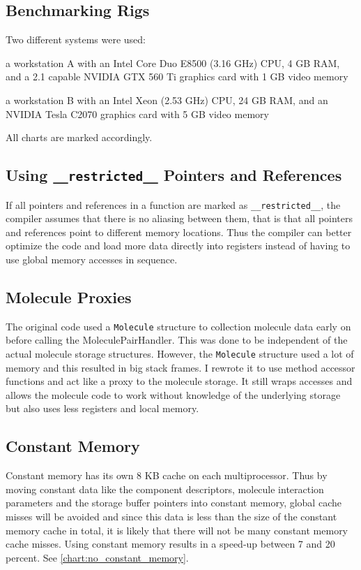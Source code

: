\subsection{Benchmarking Rigs}
Two different systems were used:
\begin{compactitem}
\item a workstation A with an Intel Core Duo E8500 (\@ 3.16 GHz) CPU, 4 GB RAM, and a \cuda{} 2.1 capable NVIDIA GTX 560 Ti graphics card with 1 GB video memory
\item a workstation B with an Intel Xeon (\@ 2.53 GHz) CPU, 24 GB RAM, and an NVIDIA Tesla C2070 graphics card with 5 GB video memory
\end{compactitem}
All charts are marked accordingly.

\subsection{Using \lstinline!__restricted__! Pointers and References}
If all pointers and references in a function are marked as \lstinline!__restricted__!, the compiler assumes that there is no aliasing between them, that is that all pointers and references point to different memory locations.
Thus the compiler can better optimize the code and load more data directly into registers instead of having to use global memory accesses in sequence.

\subsection{Molecule Proxies}
The original code used a \lstinline!Molecule! structure to collection molecule data early on before calling the MoleculePairHandler. This was done to be independent of the actual molecule storage structures.
However, the \lstinline!Molecule! structure used a lot of memory and this resulted in big stack frames.
I rewrote it to use method accessor functions and act like a proxy to the molecule storage. It still wraps accesses and allows the molecule code to work without knowledge of the underlying storage but also uses less registers and local memory.

\subsection{Constant Memory}
Constant memory has its own 8 KB cache on each multiprocessor. Thus by moving constant data like the component descriptors, molecule interaction parameters and the storage buffer pointers into constant memory, global cache misses will be avoided and since this data is less than the size of the constant memory cache in total, it is likely that there will not be many constant memory cache misses.
Using constant memory results in a speed-up between 7 and 20 percent. See  \autoref{chart:no_constant_memory}.

